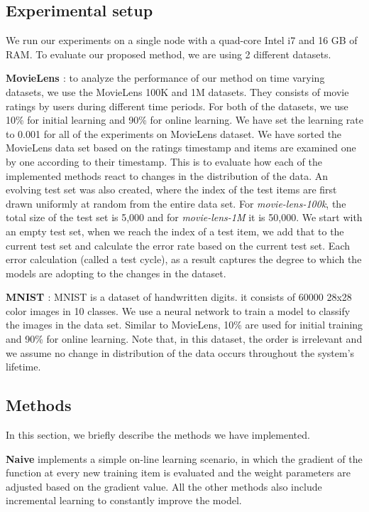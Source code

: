 \documentclass{vldb}
\begin{document}
\subsection{Experimental setup}
We run our experiments on a single node with a quad-core Intel i7 and 16 GB of RAM. 
To evaluate our proposed method, we are using 2 different datasets.

\textbf{MovieLens \cite{harper2016movielens}}: to analyze the performance of our method on time varying datasets, we use the MovieLens 100K and 1M datasets. 
They consists of movie ratings by users during different time periods. 
For both of the datasets, we use 10\% for initial learning and 90\% for online learning. 
We have set the learning rate to 0.001 for all of the experiments on MovieLens dataset.
We have sorted the MovieLens data set based on the ratings timestamp and items are examined one by one according to their timestamp.
This is to evaluate how each of the implemented methods react to changes in the distribution of the data.
An evolving test set was also created, where the index of the test items are first drawn uniformly at random from the entire data set.
For \textit{movie-lens-100k}, the total size of the test set is 5,000 and for \textit{movie-lens-1M} it is 50,000.
We start with an empty test set, when we reach the index of a test item, we add that to the current test set and calculate the error rate based on the current test set.
Each error calculation (called a test cycle), as a result captures the degree to which the models are adopting to the changes in the dataset.

\textbf{MNIST \cite{lecun-mnist}}: MNIST is a dataset of handwritten digits.
it consists of 60000 28x28 color images in 10 classes. We use a neural network to train a model to classify the images in the data set. 
Similar to MovieLens, 10\% are used for initial training and 90\% for online learning. 
Note that, in this dataset, the order is irrelevant and we assume no change in distribution of the data occurs throughout the system's lifetime. 

\subsection{Methods}
In this section, we briefly describe the methods we have implemented.

\textbf{Naive} implements a simple on-line learning scenario, in which the gradient of the function at every new training item is evaluated and the weight parameters are adjusted based on the gradient value. 
All the other methods also include incremental learning to constantly improve the model.
\end{document}
